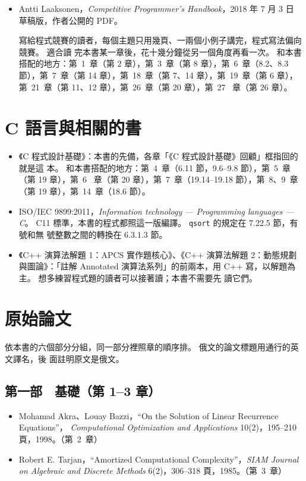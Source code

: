 \begin{itemize}
\item Antti Laaksonen，\textit{Competitive Programmer's Handbook}，2018 年 7 月 3 日
草稿版，作者公開的 PDF。

寫給程式競賽的讀者，每個主題只用幾頁、一兩個小例子講完，程式寫法偏向競賽。 適合讀
完本書某一章後，花十幾分鐘從另一個角度再看一次。 和本書搭配的地方：第~1~章（第 2
章），第~3~章（第 8 章），第~6~章（8.2、8.3 節），第~7~章（第 14 章），第~18~章（第
7、14 章），第~19~章（第 6 章），第~21~章（第 11、12 章），第~26~章（第 20 章），第~27~
章（第 26 章）。
\end{itemize}

\section*{C 語言與相關的書}

\begin{itemize}
\item 《C 程式設計基礎》：本書的先備，各章「《C 程式設計基礎》回顧」框指回的就是這
本。 和本書搭配的地方：第~4~章（6.11 節，9.6--9.8 節），第~5~章（第 19 章），第~6~
章（第 20 章），第~7~章（19.14--19.18 節），第~8、9~章（第 19 章），第~14~章（18.6
節）。

\item ISO/IEC 9899:2011，\textit{Information technology --- Programming languages ---
C}。 C11 標準，本書的程式都照這一版編譯。 \texttt{qsort} 的規定在 7.22.5 節，有號和無
號整數之間的轉換在 6.3.1.3 節。

\item 《C++ 演算法解題 1：APCS 實作題核心》、《C++ 演算法解題 2：動態規劃與圖論》：「註解
Annotated 演算法系列」的前兩本，用 C++ 寫，以解題為主。 想多練習程式題的讀者可以接著讀；本書不需要先
讀它們。
\end{itemize}

\section*{原始論文}

依本書的六個部分分組，同一部分裡照章的順序排。 俄文的論文標題用通行的英文譯名，後
面註明原文是俄文。

\subsection*{第一部　基礎（第 1--3 章）}

\begin{itemize}
\item Mohamad Akra、Louay Bazzi，``On the Solution of Linear Recurrence Equations''，
\textit{Computational Optimization and Applications} 10(2)，195--210 頁，1998。（第~2~章）
\item Robert E. Tarjan，``Amortized Computational Complexity''，\textit{SIAM Journal on
Algebraic and Discrete Methods} 6(2)，306--318 頁，1985。（第~3~章）
\end{itemize}

